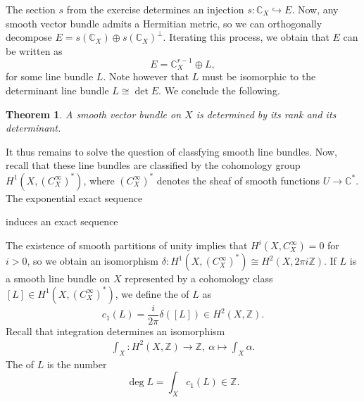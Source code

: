 \documentclass[12pt,a4paper]{amsbook}
\newtheorem{thm}{Theorem}[chapter]
\theoremstyle{remark} \newtheorem{rmk}[thm]{Remark}
\theoremstyle{definition} \newtheorem{defn}[thm]{Definition}
\theoremstyle{definition} \newtheorem{ex}[thm]{Example}
\theoremstyle{definition} \newtheorem{ej}{Exercise}
\let\emph\relax
\newcommand{\C}{\mathbb C}
\newcommand{\Z}{\mathbb Z}
\begin{document}
The section $s$ from the exercise determines an injection $s:\C_X \hookrightarrow E$. Now, any smooth vector bundle admits a Hermitian metric, so we can orthogonally decompose  $E=s(\C_X) \oplus s(\C_X)^\perp$. Iterating this process, we obtain that $E$ can be written as
\begin{equation*}
E = \C_X^{r-1} \oplus L,
\end{equation*} 
for some line bundle $L$. Note however that  $L$ must be isomorphic to the determinant line bundle $L\cong \det E$. We conclude the following.

\begin{thm}
A smooth vector bundle on $X$ is determined by its rank and its determinant.	
\end{thm}

It thus remains to solve the question of classfying smooth line bundles. Now, recall that these line bundles are classified by the cohomology group $H^1(X,(C^\infty_X)^*)$, where $(C^\infty_X)^*$ denotes the sheaf of smooth functions $U\rightarrow \C^*$. The exponential exact sequence
\begin{center}
\end{center}
induces an exact sequence
\begin{center}
\end{center}
The existence of smooth partitions of unity implies that $H^i(X,C^\infty_X)=0$ for $i>0$, so we obtain an isomorphism  $\delta:H^1(X,(C^\infty_X)^*)\cong H^2(X,2\pi i \Z)$. If $L$ is a smooth line bundle on $X$ represented by a cohomology class $[L]\in H^1(X,(C^\infty_X)^*)$, we define the \emph{first Chern class} of $L$ as
 \begin{equation*}
c_1(L) = \frac{i}{2\pi} \delta([L]) \in H^2(X,\Z).
\end{equation*} 
Recall that integration determines an isomorphism
\begin{align*}
\int_X: H^2(X,\Z)  \rightarrow \Z, \  \alpha  \mapsto \int_X \alpha.
\end{align*} 
The \emph{degree} of $L$ is the number
\begin{equation*}
\deg L= \int_X c_1(L) \in \Z.
\end{equation*} 
\end{document}
